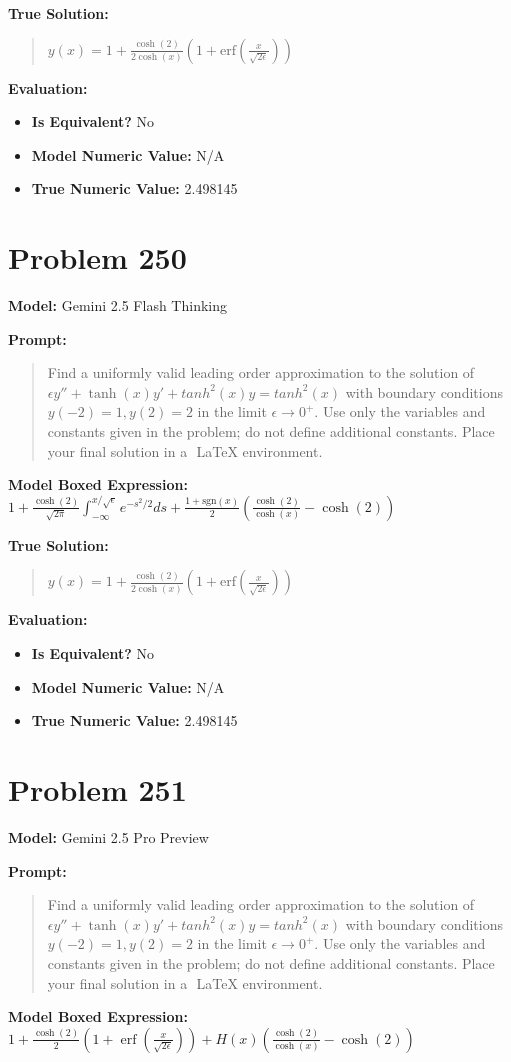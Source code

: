 \documentclass{article}
\begin{document}
{\textbf{True Solution:}
\begin{quote}
$y(x)=1+\frac{\cosh(2)}{2\cosh(x)}(1+\text{erf}(\frac{x}{\sqrt{2\epsilon}}))$
\end{quote}

\textbf{Evaluation:}
\begin{itemize}
\item \textbf{Is Equivalent?} No
\item \textbf{Model Numeric Value:} N/A
\item \textbf{True Numeric Value:} 2.498145
\end{itemize}
\vspace{1cm}
\section*{Problem 250}
\textbf{Model:} Gemini 2.5 Flash Thinking

\textbf{Prompt:}
\begin{quote}
Find a uniformly valid leading order approximation to the solution of $\epsilon y'' + \tanh(x)y' + tanh^2(x)y=tanh^2(x)$ with boundary conditions $y(-2)=1, y(2)=2$ in the limit $\epsilon \to 0^+$. Use only the variables and constants given in the problem; do not define additional constants. Place your final solution in a $\boxed{}$ LaTeX environment.
\end{quote}
\textbf{Model Boxed Expression:} $1 + \frac{\cosh(2)}{\sqrt{2\pi}}\int_{-\infty}^{x/\sqrt{\epsilon}} e^{-s^2/2}ds + \frac{1+\text{sgn}(x)}{2}\left(\frac{\cosh(2)}{\cosh(x)} - \cosh(2)\right)$

\textbf{True Solution:}
\begin{quote}
$y(x)=1+\frac{\cosh(2)}{2\cosh(x)}(1+\text{erf}(\frac{x}{\sqrt{2\epsilon}}))$
\end{quote}

\textbf{Evaluation:}
\begin{itemize}
\item \textbf{Is Equivalent?} No
\item \textbf{Model Numeric Value:} N/A
\item \textbf{True Numeric Value:} 2.498145
\end{itemize}
\vspace{1cm}
\section*{Problem 251}
\textbf{Model:} Gemini 2.5 Pro Preview

\textbf{Prompt:}
\begin{quote}
Find a uniformly valid leading order approximation to the solution of $\epsilon y'' + \tanh(x)y' + tanh^2(x)y=tanh^2(x)$ with boundary conditions $y(-2)=1, y(2)=2$ in the limit $\epsilon \to 0^+$. Use only the variables and constants given in the problem; do not define additional constants. Place your final solution in a $\boxed{}$ LaTeX environment.
\end{quote}
\textbf{Model Boxed Expression:} $1 + \frac{\cosh(2)}{2}\left(1+\operatorname{erf}\left(\frac{x}{\sqrt{2\epsilon}}\right)\right) + H(x)\left(\frac{\cosh(2)}{\cosh(x)} - \cosh(2)\right)$

}
\end{document}
